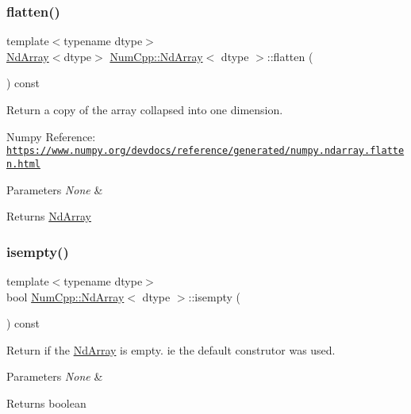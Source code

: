 \subsubsection{\texorpdfstring{flatten()}{flatten()}}
{\footnotesize\ttfamily template$<$typename dtype$>$ \\
\mbox{\hyperlink{class_num_cpp_1_1_nd_array}{Nd\+Array}}$<$dtype$>$ \mbox{\hyperlink{class_num_cpp_1_1_nd_array}{Num\+Cpp\+::\+Nd\+Array}}$<$ dtype $>$\+::flatten (\begin{DoxyParamCaption}{ }\end{DoxyParamCaption}) const\hspace{0.3cm}{\ttfamily [inline]}}

Return a copy of the array collapsed into one dimension.

Numpy Reference\+: \href{https://www.numpy.org/devdocs/reference/generated/numpy.ndarray.flatten.html}{\tt https\+://www.\+numpy.\+org/devdocs/reference/generated/numpy.\+ndarray.\+flatten.\+html}


\begin{DoxyParams}{Parameters}
{\em None} & \\
\hline
\end{DoxyParams}
\begin{DoxyReturn}{Returns}
\mbox{\hyperlink{class_num_cpp_1_1_nd_array}{Nd\+Array}} 
\end{DoxyReturn}
\mbox{\label{class_num_cpp_1_1_nd_array_ae1b8560fe448e702b51b83b6e3a5c844}} 
\subsubsection{\texorpdfstring{isempty()}{isempty()}}
{\footnotesize\ttfamily template$<$typename dtype$>$ \\
bool \mbox{\hyperlink{class_num_cpp_1_1_nd_array}{Num\+Cpp\+::\+Nd\+Array}}$<$ dtype $>$\+::isempty (\begin{DoxyParamCaption}{ }\end{DoxyParamCaption}) const\hspace{0.3cm}{\ttfamily [inline]}}

Return if the \mbox{\hyperlink{class_num_cpp_1_1_nd_array}{Nd\+Array}} is empty. ie the default construtor was used.


\begin{DoxyParams}{Parameters}
{\em None} & \\
\hline
\end{DoxyParams}
\begin{DoxyReturn}{Returns}
boolean 
\end{DoxyReturn}
\mbox{\label{class_num_cpp_1_1_nd_array_af5d55944e1693657135b30972f658f2f}} 
